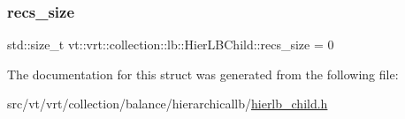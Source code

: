 \mbox{\label{structvt_1_1vrt_1_1collection_1_1lb_1_1_hier_l_b_child_a1e46ff60f1708faa33370015ed7466de}} 
\subsubsection{\texorpdfstring{recs\+\_\+size}{recs\_size}}
{\footnotesize\ttfamily std\+::size\+\_\+t vt\+::vrt\+::collection\+::lb\+::\+Hier\+L\+B\+Child\+::recs\+\_\+size = 0}



The documentation for this struct was generated from the following file\+:\begin{DoxyCompactItemize}
\item 
src/vt/vrt/collection/balance/hierarchicallb/\hyperlink{hierlb__child_8h}{hierlb\+\_\+child.\+h}\end{DoxyCompactItemize}
